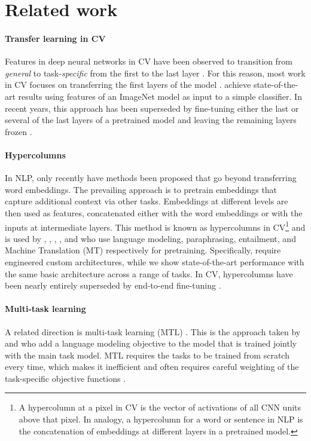 \documentclass[11pt,a4paper]{article}
\begin{document}
\section{Related work}

\paragraph{Transfer learning in CV} Features in deep neural networks in CV have been observed to transition from \emph{general} to task-\emph{specific} from the first to the last layer \cite{yosinski2014transferable}. For this reason, most work in CV focuses on transferring the first layers of the model \cite{Long2015a}.  achieve state-of-the-art results using features of an ImageNet model as input to a simple classifier. In recent years, this approach has been superseded by fine-tuning either the last \cite{donahue2014decaf} or several of the last layers of a pretrained model and leaving the remaining layers frozen \cite{long2015fully}.

\paragraph{Hypercolumns} In NLP, only recently have methods been proposed that go beyond transferring word embeddings. The prevailing approach is to pretrain embeddings that capture additional context via other tasks. Embeddings at different levels are then used as features, concatenated either with the word embeddings or with the inputs at intermediate layers. This method is known as hypercolumns \cite{hariharan2015hypercolumns} in CV\footnote{A hypercolumn at a pixel in CV is the vector of activations of all CNN units above that pixel. In analogy, a hypercolumn for a word or sentence in NLP is the concatenation of embeddings at different layers in a pretrained model.} and is used by , , , , and  who use language modeling, paraphrasing, entailment, and Machine Translation (MT) respectively for pretraining. Specifically,  require engineered custom architectures, while we show state-of-the-art performance with the same basic architecture across a range of tasks. In CV, hypercolumns have been nearly entirely superseded by end-to-end fine-tuning \cite{long2015fully}.

\paragraph{Multi-task learning} A related direction is multi-task learning (MTL) \cite{Caruana1993}. This is the approach taken by  and  who add a language modeling objective to the model that is trained jointly with the main task model.
MTL requires the tasks to be trained from scratch every time, which makes it inefficient and often requires careful weighting of the task-specific objective functions \cite{Chen2017}.
\end{document}
